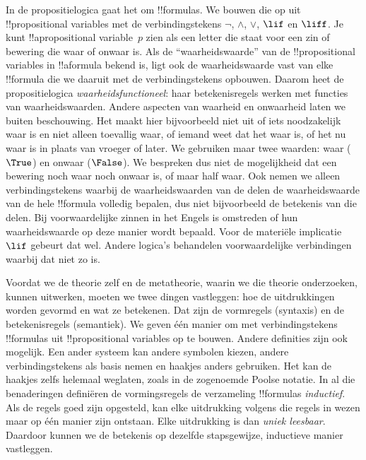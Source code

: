 \documentclass[../../../include/open-logic-section]{subfiles}
\begin{document}


In de propositielogica gaat het om !!{formula}s. We bouwen die op uit
!!{propositional variable}s met de verbindingstekens $\lnot$, $\land$,
$\lor$, $\lif$ en $\liff$. Je kunt !!a{propositional variable}~$p$
zien als een letter die staat voor een zin of bewering die waar of
onwaar is. Als de ``waarheidswaarde'' van de !!{propositional
variable}s in !!a{formula} bekend is, ligt ook de waarheidswaarde vast
van elke !!{formula} die we daaruit met de verbindingstekens opbouwen.
Daarom heet de propositielogica \emph{waarheidsfunctioneel}: haar
betekenisregels werken met functies van waarheidswaarden. Andere
aspecten van waarheid en onwaarheid laten we buiten beschouwing. Het
maakt hier bijvoorbeeld niet uit of iets noodzakelijk waar is en niet
alleen toevallig waar, of iemand weet dat het waar is, of het nu waar
is in plaats van vroeger of later. We gebruiken maar twee waarden:
waar ($\True$) en onwaar ($\False$). We bespreken dus niet de
mogelijkheid dat een bewering noch waar noch onwaar is, of maar half
waar. Ook nemen we alleen verbindingstekens waarbij de
waarheidswaarden van de delen de waarheidswaarde van de hele
!!{formula} volledig bepalen, dus niet bijvoorbeeld de betekenis van
die delen. Bij voorwaardelijke zinnen in het Engels is omstreden
of hun waarheidswaarde op deze manier wordt bepaald. Voor de materiële
implicatie~$\lif$ gebeurt dat wel. Andere logica's behandelen
voorwaardelijke verbindingen waarbij dat niet zo is.

Voordat we de theorie zelf en de metatheorie, waarin we die theorie
onderzoeken, kunnen uitwerken, moeten we twee dingen vastleggen: hoe de
uitdrukkingen worden gevormd en wat ze betekenen. Dat zijn de
vormregels (syntaxis) en de betekenisregels (semantiek). We geven één
manier om met verbindingstekens !!{formula}s uit !!{propositional
variable}s op te bouwen. Andere definities zijn ook mogelijk. Een
ander systeem kan andere symbolen kiezen, andere verbindingstekens als
basis nemen en haakjes anders gebruiken. Het kan de haakjes zelfs
helemaal weglaten, zoals in de zogenoemde Poolse notatie. In al die
benaderingen definiëren de vormingsregels de verzameling !!{formula}s
\emph{inductief}. Als de regels goed zijn opgesteld, kan elke
uitdrukking volgens die regels in wezen maar op één manier zijn
ontstaan. Elke uitdrukking is dan \emph{uniek leesbaar}. Daardoor
kunnen we de betekenis op dezelfde stapsgewijze, inductieve manier
vastleggen.
\end{document}

